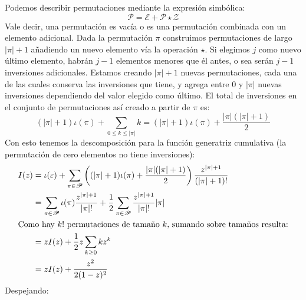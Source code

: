   Podemos describir permutaciones mediante la expresión simbólica:
  \begin{equation}
    \label{eq:P-class}
    \mathscr{P}
      = \mathscr{E} + \mathscr{P} \star \mathscr{Z}
  \end{equation}
  Vale decir,
  una permutación es vacía
  o es una permutación combinada con un elemento adicional.
  Dada la permutación \(\pi\)
  construimos permutaciones de largo \(\lvert \pi \rvert + 1\)
  añadiendo un nuevo elemento vía la operación \(\star\).
  Si elegimos \(j\) como nuevo último elemento,
  habrán \(j - 1\) elementos menores que él antes,
  o sea serán \(j - 1\) inversiones adicionales.
  Estamos creando \(\lvert \pi \rvert + 1\) nuevas permutaciones,
  cada una de las cuales conserva las inversiones que tiene,
  y agrega entre \num{0} y \(\lvert \pi \rvert\) nuevas inversiones
  dependiendo del valor elegido como último.
  El total de inversiones en el conjunto de permutaciones así creado
  a partir de \(\pi\) es:
  \begin{equation}
    \label{eq:iota-decomposed}
    (\lvert \pi \rvert + 1) \iota(\pi)
      + \sum_{0 \le k \le \lvert \pi \rvert} k
      = (\lvert \pi \rvert + 1) \iota(\pi)
          +  \frac{\lvert \pi \rvert ( \lvert \pi \rvert + 1)}{2}
  \end{equation}
  Con esto tenemos la descomposición para la función generatriz cumulativa
  (la permutación de cero elementos no tiene inversiones):
  \begin{align}
    I(z)
      &= \iota(\varepsilon)
           + \sum_{\pi \in \mathscr{P}}
               \left(
                 (\lvert \pi \rvert + 1) \iota(\pi)
                     +	\frac{\lvert \pi \rvert ( \lvert \pi \rvert + 1)}{2}
               \right)
               \frac{z^{\lvert \pi \rvert + 1}}{(\lvert \pi \rvert + 1)!}
                   \label{eq:Inv-decomposed} \\
      &= \sum_{\pi \in \mathscr{P}}
           \iota(\pi) \frac{z^{\lvert \pi \rvert + 1}}{\lvert \pi \rvert !}
           + \frac{1}{2}
               \sum_{\pi \in \mathscr{P}}
                 \frac{z^{\lvert \pi \rvert + 1}}{\lvert \pi \rvert !}
                 \lvert \pi \rvert \notag \\
   \intertext{Como hay \(k!\) permutaciones de tamaño \(k\),
              sumando sobre tamaños resulta:}
      &= z I(z) + \frac{1}{2} z \sum_{k \ge 0} k z^k \notag \\
      &= z I(z) + \frac{z^2}{2 (1 - z)^2}
  \end{align}
  Despejando:
